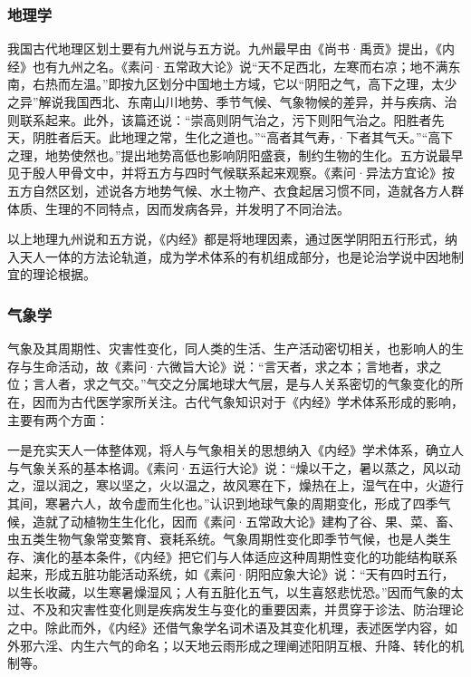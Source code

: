 \documentclass[draft,12pt]{ctexbook}
\begin{document}
\subsubsection{地理学}%

我国古代地理区划土要有九州说与五方说。九州最早由《尚书·禹贡》提出，《内经》也有九州之名。《素问·五常政大论》说“天不足西北，左寒而右凉；地不满东南，右热而左温。”即按九区划分中国地土方域，它以“阴阳之气，高下之理，太少之异”解说我国西北、东南山川地势、季节气候、气象物候的差异，并与疾病、治则联系起来。此外，该篇还说：“崇高则阴气治之，污下则阳气治之。阳胜者先天，阴胜者后天。此地理之常，生化之道也。”“高者其气寿，·下者其气夭。”“高下之理，地势使然也。”提出地势高低也影响阴阳盛衰，制约生物的生化。五方说最早见于殷人甲骨文中，并将五方与四时气候联系起来观察。《素问·异法方宜论》按五方自然区划，述说各方地势气候、水土物产、衣食起居习惯不同，造就各方人群体质、生理的不同特点，因而发病各异，并发明了不同治法。

以上地理九州说和五方说，《内经》都是将地理因素，通过医学阴阳五行形式，纳入天人一体的方法论轨道，成为学术体系的有机组成部分，也是论治学说中因地制宜的理论根据。

\subsubsection{气象学}%

气象及其周期性、灾害性变化，同人类的生活、生产活动密切相关，也影响人的生存与生命活动，故《素问·六微旨大论》说：“言天者，求之本；言地者，求之位；言人者，求之气交。”气交之分属地球大气层，是与人关系密切的气象变化的所在，因而为古代医学家所关注。古代气象知识对于《内经》学术体系形成的影响，主要有两个方面：

一是充实天人一体整体观，将人与气象相关的思想纳入《内经》学术体系，确立人与气象关系的基本格调。《素问·五运行大论》说：“燥以干之，暑以蒸之，风以动之，湿以润之，寒以坚之，火以温之，故风寒在下，燥热在上，湿气在中，火遊行其间，寒暑六人，故令虚而生化也。”认识到地球气象的周期变化，形成了四季气候，造就了动植物生生化化，因而《素问·五常政大论》建构了谷、果、菜、畜、虫五类生物气象常变繁育、衰耗系统。气象周期性变化即季节气候，也是人类生存、演化的基本条件，《内经》把它们与人体适应这种周期性变化的功能结构联系起来，形成五脏功能活动系统，如《素问·阴阳应象大论》说：“天有四时五行，以生长收藏，以生寒暑燥湿风；人有五脏化五气，以生喜怒悲忧恐。”因而气象的太过、不及和灾害性变化则是疾病发生与变化的重要因素，并贯穿于诊法、防治理论之中。除此而外，《内经》还借气象学名词术语及其变化机理，表述医学内容，如外邪六淫、内生六气的命名；以天地云雨形成之理阐述阳阴互根、升降、转化的机制等。
\end{document}
